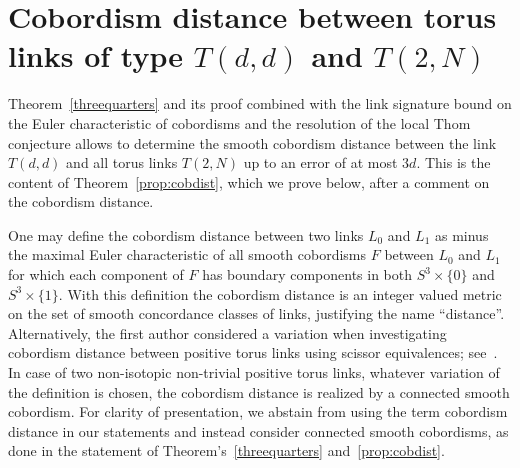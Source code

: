 \section{Cobordism distance between torus links of type \texorpdfstring{$T(d,d)$}{T(d,d)} and \texorpdfstring{$T(2,N)$}{T(2,N)}}\label{sec:asymdist}

Theorem~\ref{threequarters} and its proof combined with the link signature bound on the Euler characteristic of cobordisms and the resolution of the local Thom conjecture allows to determine the smooth cobordism distance between the link $T(d,d)$ and all torus links $T(2,N)$ up to an error of at most $3d$. This is the content of Theorem~\ref{prop:cobdist}, which we prove below, after a comment on the cobordism distance.

One may define the cobordism distance between two links $L_0$ and $L_1$ as minus the maximal Euler characteristic of all smooth cobordisms $F$ between $L_0$ and $L_1$ for which each component of $F$ has boundary components in both $S^3\times\{0\}$ and $S^3\times\{1\}$. With this definition the cobordism distance is an integer valued metric on the set of smooth concordance classes of links, justifying the name ``distance''. Alternatively, the first author considered a variation when investigating cobordism distance between positive torus links using scissor equivalences; see~\cite{Baader_ScissorEq}. In case of two non-isotopic non-trivial positive torus links, whatever variation of the definition is chosen, the cobordism distance is realized by a connected smooth cobordism. For clarity of presentation, we abstain from using the term cobordism distance in our statements and instead consider connected smooth cobordisms, as done in the statement of Theorem's~\ref{threequarters} and~\ref{prop:cobdist}.

